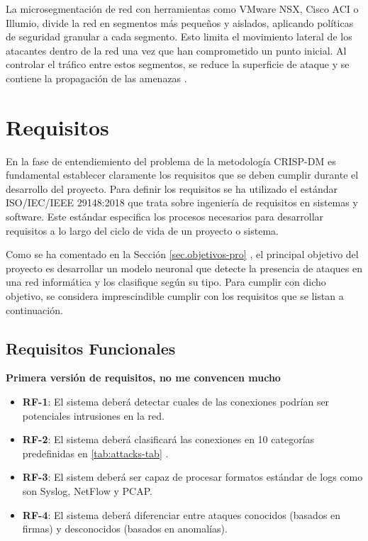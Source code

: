 La microsegmentación de red con herramientas como VMware NSX, Cisco ACI o Illumio, divide la red en segmentos más pequeños y aislados, aplicando políticas de seguridad granular a cada segmento. Esto limita el movimiento lateral de los atacantes dentro de la red una vez que han comprometido un punto inicial. Al controlar el tráfico entre estos segmentos, se reduce la superficie de ataque y se contiene la propagación de las amenazas \cite{paloaltonetworks_microsegmentation}.

\section{Requisitos}  \label{sec.requisitos} 
En la fase de entendiemiento del problema de la metodología CRISP-DM es fundamental establecer claramente los requisitos que se deben cumplir durante el desarrollo del proyecto. Para definir los requisitos se ha utilizado el estándar ISO/IEC/IEEE 29148:2018 \cite{ISO29148} que trata sobre ingeniería de requisitos en sistemas y software. Este estándar especifica los procesos necesarios para desarrollar requisitos a lo largo del ciclo de vida de un proyecto o sistema.

Como se ha comentado en la Sección \ref{sec.objetivos-pro} , el principal objetivo del proyecto es desarrollar un modelo neuronal que detecte la presencia de ataques en una red informática y los clasifique según su tipo. Para cumplir con dicho objetivo, se considera imprescindible cumplir con los requisitos que se listan a continuación.

\subsection{Requisitos Funcionales}   \label{sec.req-funcionales}
\textbf{Primera versión de requisitos, no me convencen mucho}
\begin{itemize}  
    \item \textbf{RF-1}: El sistema deberá detectar cuales de las conexiones podrían ser potenciales intrusiones en la red.
    \item \textbf{RF-2}: El sistema deberá clasificará las conexiones en 10 categorías predefinidas en \ref{tab:attacks-tab} .  
	\item \textbf{RF-3}: El sistem deberá ser capaz de procesar formatos estándar de logs como son Syslog, NetFlow y PCAP.
	\item \textbf{RF-4}: El sistema deberá diferenciar entre ataques conocidos (basados en firmas) y desconocidos (basados en anomalías).
	
\end{itemize}  

